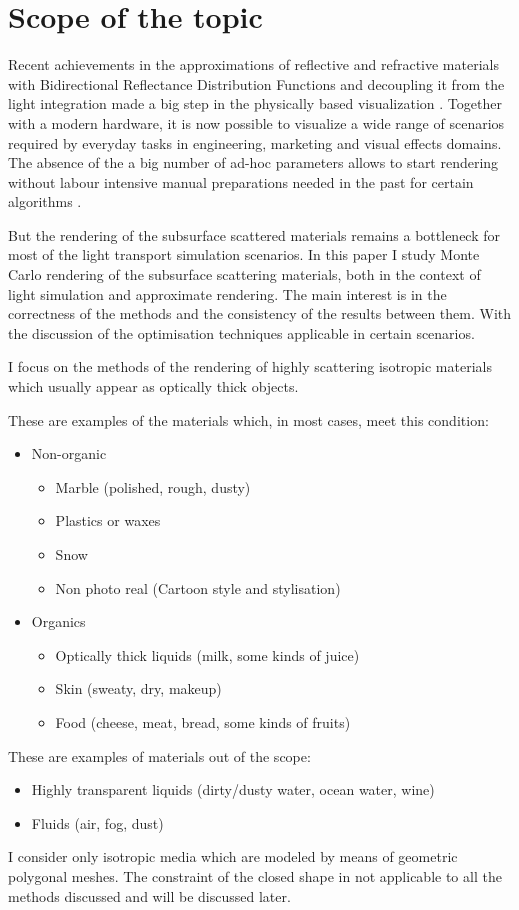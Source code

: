 \section{Scope of the topic}
\label{section:scope}

Recent achievements in the approximations of reflective and refractive materials with Bidirectional
Reflectance Distribution Functions and decoupling it from the light integration made a big step in
the physically based visualization \cite{pharr2010physically}. Together with a modern hardware, it
is now possible to visualize a wide range of scenarios required by everyday tasks in engineering,
marketing and visual effects domains. The absence of the a big number of ad-hoc parameters allows to
start rendering without labour intensive manual preparations needed in the past for certain
algorithms \cite{DBLP:conf/mam/KettnerRSJK15}.

But the rendering of the subsurface scattered materials remains a bottleneck for most of the light
transport simulation scenarios. In this paper I study Monte Carlo rendering of the subsurface
scattering materials, both in the context of light simulation and approximate rendering.
The main interest is in the correctness of the methods and the consistency of the results between
them. With the discussion of the optimisation techniques applicable in certain scenarios.

I focus on the methods of the rendering of highly scattering isotropic materials which usually
appear as optically thick objects.

These are examples of the materials which, in most cases, meet this condition:
\begin{itemize}
    \item Non-organic
    \begin{itemize}
        \item Marble (polished, rough, dusty)
        \item Plastics or waxes
        \item Snow
        \item Non photo real (Cartoon style and stylisation)
    \end{itemize}
    \item Organics
    \begin{itemize}
    \item Optically thick liquids (milk, some kinds of juice)
        \item Skin (sweaty, dry, makeup)
        \item Food (cheese, meat, bread, some kinds of fruits)
    \end{itemize}
\end{itemize}
These are examples of materials out of the scope:
\begin{itemize}
    \item Highly transparent liquids (dirty/dusty water, ocean water, wine)
    \item Fluids (air, fog, dust)
\end{itemize}
I consider only isotropic media which are modeled by means of geometric
polygonal meshes. The constraint of the closed shape in not applicable to all
the methods discussed and will be discussed later.

